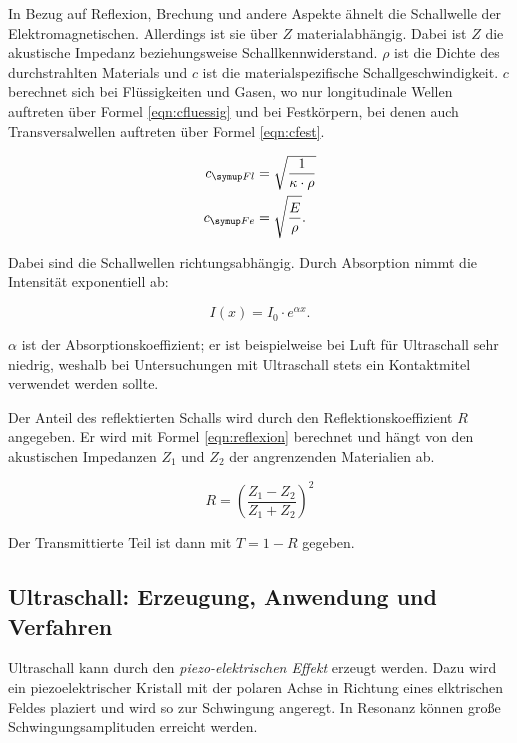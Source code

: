 In Bezug auf Reflexion, Brechung und andere Aspekte ähnelt die Schallwelle der
Elektromagnetischen. Allerdings ist sie über $Z$ materialabhängig.
Dabei ist $Z$ die akustische Impedanz beziehungsweise Schallkennwiderstand. $\rho$
ist die Dichte des durchstrahlten Materials und $c$ ist die materialspezifische Schallgeschwindigkeit.
$c$ berechnet sich bei Flüssigkeiten und Gasen, wo nur longitudinale Wellen auftreten
über Formel \eqref{eqn:cfluessig} und bei Festkörpern, bei denen auch Transversalwellen
auftreten über Formel \eqref{eqn:cfest}.

\begin{align}
  c_{\g{Fl}} &= \sqrt{\frac{1}{\kappa \cdot \rho}} \label{eqn:cfluessig}\\
  c_{\g{Fe}} &= \sqrt{\frac{E}{\rho}} \label{eqn:cfest}.
\end{align}

Dabei sind die Schallwellen richtungsabhängig. Durch Absorption nimmt die Intensität exponentiell ab:

\begin{equation}
  I(x) = I_0 \cdot e^{\alpha x} .
\end{equation}

$\alpha$ ist der Absorptionskoeffizient; er ist beispielweise bei Luft für Ultraschall sehr
niedrig, weshalb bei Untersuchungen mit Ultraschall stets ein Kontaktmitel verwendet werden sollte.

Der Anteil des reflektierten Schalls wird durch den Reflektionskoeffizient $R$ angegeben.
Er wird mit Formel \eqref{eqn:reflexion} berechnet und hängt von den akustischen Impedanzen
$Z_1$ und $Z_2$ der
angrenzenden Materialien ab.

\begin{equation}
  R = \left(\frac{Z_1 - Z_2}{Z_1 + Z_2} \right)^2
  \label{eqn:reflexion}
\end{equation}

Der Transmittierte Teil ist dann mit $T=1-R$ gegeben.

\subsection{Ultraschall: Erzeugung, Anwendung und Verfahren}

Ultraschall kann durch den \emph{piezo-elektrischen Effekt} erzeugt werden. Dazu wird ein piezoelektrischer
Kristall mit der polaren Achse in Richtung eines elktrischen Feldes plaziert und wird so zur Schwingung
angeregt. In Resonanz können große Schwingungsamplituden erreicht werden.

